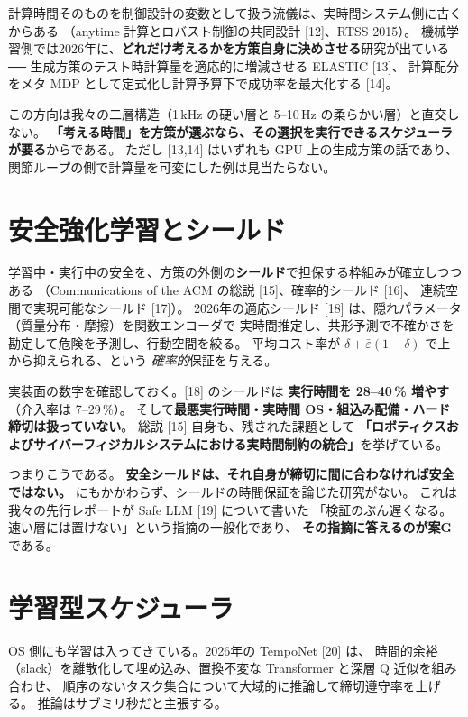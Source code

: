 \documentclass[11pt,a4paper]{article}
\newcommand{\prob}[1]{\textbf{\textcolor{red!55!black}{#1}}}
\newcommand{\keyp}[1]{\textbf{\textcolor{blue!45!black}{#1}}}
\begin{document}
計算時間そのものを制御設計の変数として扱う流儀は、実時間システム側に古くからある
（anytime 計算とロバスト制御の共同設計 [12]、RTSS 2015）。
機械学習側では2026年に、\keyp{どれだけ考えるかを方策自身に決めさせる}研究が出ている ──
生成方策のテスト時計算量を適応的に増減させる ELASTIC [13]、
計算配分をメタ MDP として定式化し計算予算下で成功率を最大化する [14]。

\noindent
この方向は我々の二層構造（1\,kHz の硬い層と 5--10\,Hz の柔らかい層）と直交しない。
\keyp{「考える時間」を方策が選ぶなら、その選択を実行できるスケジューラが要る}からである。
ただし [13,14] はいずれも GPU 上の生成方策の話であり、
関節ループの側で計算量を可変にした例は見当たらない。

\section{安全強化学習とシールド}
\label{sec:shield}

学習中・実行中の安全を、方策の外側の\keyp{シールド}で担保する枠組みが確立しつつある
（Communications of the ACM の総説 [15]、確率的シールド [16]、
連続空間で実現可能なシールド [17]）。
2026年の適応シールド [18] は、隠れパラメータ（質量分布・摩擦）を関数エンコーダで
実時間推定し、共形予測で不確かさを勘定して危険を予測し、行動空間を絞る。
平均コスト率が $\delta+\bar\varepsilon(1-\delta)$ で上から抑えられる、という
\emph{確率的}保証を与える。

\noindent
実装面の数字を確認しておく。[18] のシールドは
\prob{実行時間を 28--40\,\% 増やす}（介入率は 7--29\,\%）。
そして\prob{最悪実行時間・実時間 OS・組込み配備・ハード締切は扱っていない}。
総説 [15] 自身も、残された課題として
\keyp{「ロボティクスおよびサイバーフィジカルシステムにおける実時間制約の統合」}を挙げている。

\medskip
\noindent
つまりこうである。
\prob{安全シールドは、それ自身が締切に間に合わなければ安全ではない。}
にもかかわらず、シールドの時間保証を論じた研究がない。
これは我々の先行レポートが Safe LLM [19] について書いた
「検証のぶん遅くなる。速い層には置けない」という指摘の一般化であり、
\keyp{その指摘に答えるのが案G}である。

\section{学習型スケジューラ}

OS 側にも学習は入ってきている。2026年の TempoNet [20] は、
時間的余裕（slack）を離散化して埋め込み、置換不変な Transformer と深層 Q 近似を組み合わせ、
順序のないタスク集合について大域的に推論して締切遵守率を上げる。
推論はサブミリ秒だと主張する。
\end{document}
